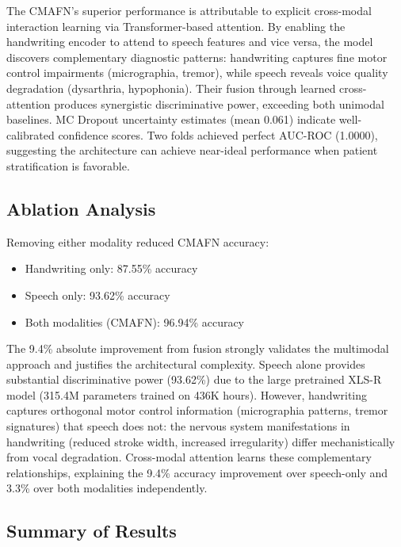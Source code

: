 \documentclass[10pt,conference,letterpaper]{IEEEtran}
\begin{document}
The CMAFN's superior performance is attributable to explicit cross-modal interaction learning via Transformer-based attention. By enabling the handwriting encoder to attend to speech features and vice versa, the model discovers complementary diagnostic patterns: handwriting captures fine motor control impairments (micrographia, tremor), while speech reveals voice quality degradation (dysarthria, hypophonia). Their fusion through learned cross-attention produces synergistic discriminative power, exceeding both unimodal baselines. MC Dropout uncertainty estimates (mean 0.061) indicate well-calibrated confidence scores. Two folds achieved perfect AUC-ROC (1.0000), suggesting the architecture can achieve near-ideal performance when patient stratification is favorable.

\subsection{Ablation Analysis}

Removing either modality reduced CMAFN accuracy:
\begin{itemize}
    \item Handwriting only: 87.55\% accuracy
    \item Speech only: 93.62\% accuracy
    \item Both modalities (CMAFN): 96.94\% accuracy
\end{itemize}

The 9.4\% absolute improvement from fusion strongly validates the multimodal approach and justifies the architectural complexity. Speech alone provides substantial discriminative power (93.62\%) due to the large pretrained XLS-R model (315.4M parameters trained on 436K hours). However, handwriting captures orthogonal motor control information (micrographia patterns, tremor signatures) that speech does not: the nervous system manifestations in handwriting (reduced stroke width, increased irregularity) differ mechanistically from vocal degradation. Cross-modal attention learns these complementary relationships, explaining the 9.4\% accuracy improvement over speech-only and 3.3\% over both modalities independently.

\subsection{Summary of Results}
\end{document}
